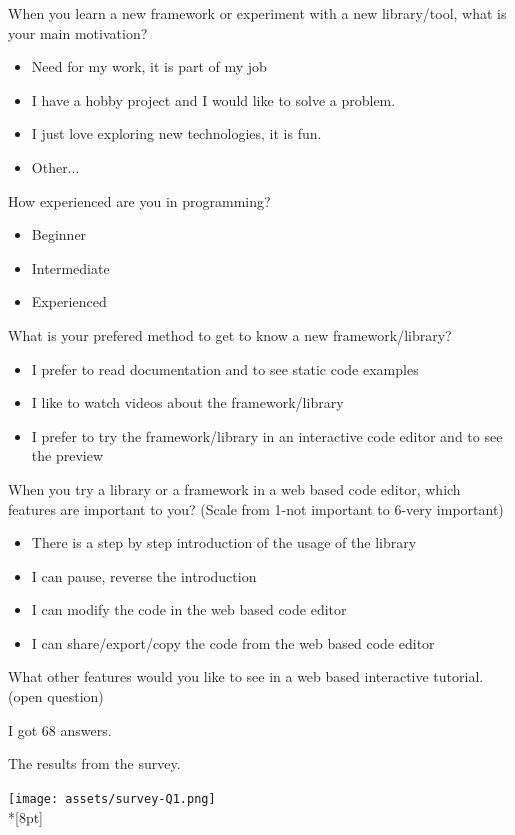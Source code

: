 \documentclass[12pt, a4paper, oneside, openright, medskipamount]{report}
\begin{document}
\noindent When you learn a new framework or experiment with a new library/tool, what is your main motivation?
\begin{itemize}[noitemsep]
\item Need for my work, it is part of my job
\item I have a hobby project and I would like to solve a problem.
\item I just love exploring new technologies, it is fun.
\item Other...
\end{itemize}

\noindent How experienced are you in programming?
\begin{itemize}[noitemsep]
\item Beginner
\item Intermediate
\item Experienced
\end{itemize}

\noindent What is your prefered method to get to know a new framework/library?
\begin{itemize}[noitemsep]
\item I prefer to read documentation and to see static code examples
\item I like to watch videos about the framework/library
\item I prefer to try the framework/library in an interactive code editor and to see the preview
\end{itemize}

\noindent When you try a library or a framework in a web based code editor, which features are important to you? (Scale from 1-not important to 6-very important)
\begin{itemize}[noitemsep]
\item There is a step by step introduction of the usage of the library
\item I can pause, reverse the introduction
\item I can modify the code in the web based code editor
\item I can share/export/copy the code from the web based code editor
\end{itemize}

What other features would you like to see in a web based interactive tutorial.
(open question)

I got 68 answers.

The results from the survey.

\texttt{[image: assets/survey-Q1.png]}\\*[8pt]
\end{document}
